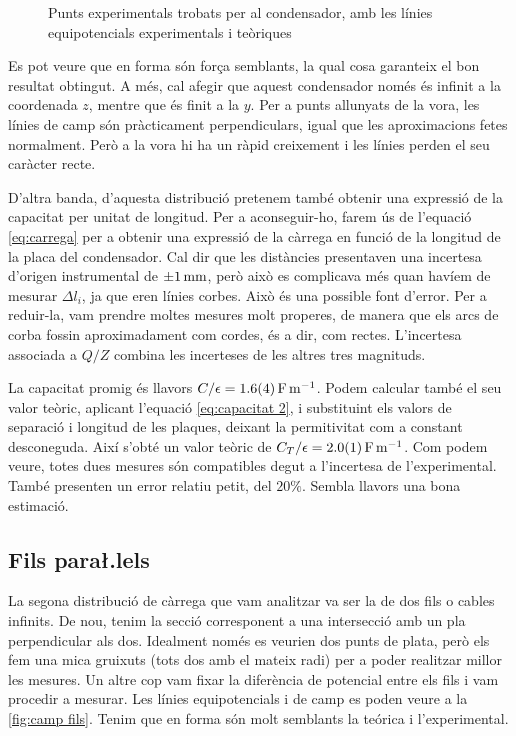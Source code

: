 \begin{figure}[htb]
  \centering \small \sffamily
  
  \caption{Punts experimentals trobats per al condensador, amb les línies equipotencials experimentals i teòriques}
  \label{fig:camp condensador}
\end{figure}

Es pot veure que en forma són força semblants, la qual cosa garanteix el bon resultat obtingut. A més, cal afegir que aquest condensador només és infinit a la coordenada $z$, mentre que és finit a la $y$. Per a punts allunyats de la vora, les línies de camp són pràcticament perpendiculars, igual que les aproximacions fetes normalment. Però a la vora hi ha un ràpid creixement i les línies perden el seu caràcter recte.

D'altra banda, d'aquesta distribució pretenem també obtenir una expressió de la capacitat per unitat de longitud. Per a aconseguir-ho, farem ús de l'equació \cref{eq:carrega} per a obtenir una expressió de la càrrega en funció de la longitud de la placa del condensador. Cal dir que les distàncies presentaven una incertesa d'origen instrumental de $ \data{}{1}{mm} $, però això es complicava més quan havíem de mesurar $\Delta l_i$, ja que eren línies corbes. Això és una possible font d'error. Per a reduir-la, vam prendre moltes mesures molt properes, de manera que els arcs de corba fossin aproximadament com cordes, és a dir, com rectes. L'incertesa associada a $Q/Z$ combina les incerteses de les altres tres magnituds.

La capacitat promig és llavors $C/\epsilon = \data{1.6}{0.4}{F.m^{-1}}$. Podem calcular també el seu valor teòric, aplicant l'equació \cref{eq:capacitat 2}, i substituint els valors de separació i longitud de les plaques, deixant la permitivitat com a constant desconeguda.
Així s'obté un valor teòric de $C_T/\epsilon = \data{2.0}{0.1}{F.m^{-1}} $. Com podem veure, totes dues mesures són compatibles degut a l'incertesa de l'experimental. També presenten un error relatiu petit, del $20\%$. Sembla llavors una bona estimació.

\subsection{Fils para\l.lels}
La segona distribució de càrrega que vam analitzar va ser la de dos fils o cables infinits. De nou, tenim la secció corresponent a una intersecció amb un pla perpendicular als dos. Idealment només es veurien dos punts de plata, però els fem una mica gruixuts (tots dos amb el mateix radi) per a poder realitzar millor les mesures. Un altre cop vam fixar la diferència de potencial entre els fils i vam procedir a mesurar. Les línies equipotencials i de camp es poden veure a la \cref{fig:camp fils}. Tenim que en forma són molt semblants la teórica i l'experimental.

